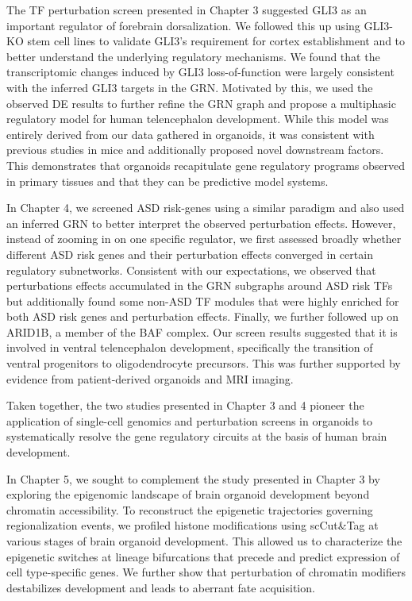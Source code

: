 The TF perturbation screen presented in Chapter 3 suggested GLI3 as an important regulator of forebrain dorsalization. We followed this up using GLI3-KO stem cell lines to validate GLI3's requirement for cortex establishment and to better understand the underlying regulatory mechanisms. We found that the transcriptomic changes induced by GLI3 loss-of-function were largely consistent with the inferred GLI3 targets in the GRN. Motivated by this, we used the observed DE results to further refine the GRN graph and propose a multiphasic regulatory model for human telencephalon development. While this model was entirely derived from our data gathered in organoids, it was consistent with previous studies in mice and additionally proposed novel downstream factors. This demonstrates that organoids recapitulate gene regulatory programs observed in primary tissues and that they can be predictive model systems.

In Chapter 4, we screened ASD risk-genes using a similar paradigm and also used an inferred GRN to better interpret the observed perturbation effects. However, instead of zooming in on one specific regulator, we first assessed broadly whether different ASD risk genes and their perturbation effects converged in certain regulatory subnetworks. Consistent with our expectations, we observed that perturbations effects accumulated in the GRN subgraphs around ASD risk TFs but additionally found some non-ASD TF modules that were highly enriched for both ASD risk genes and perturbation effects. Finally, we further followed up on ARID1B, a member of the BAF complex. Our screen results suggested that it is involved in ventral telencephalon development, specifically the transition of ventral progenitors to oligodendrocyte precursors. This was further supported by evidence from patient-derived organoids and MRI imaging. 

Taken together, the two studies presented in Chapter 3 and 4 pioneer the application of single-cell genomics and perturbation screens in organoids to systematically resolve the gene regulatory circuits at the basis of human brain development. 

In Chapter 5, we sought to complement the study presented in Chapter 3 by exploring the epigenomic landscape of brain organoid development beyond chromatin accessibility. To reconstruct the epigenetic trajectories governing regionalization events, we profiled histone modifications using scCut\&Tag at various stages of brain organoid development. This allowed us to characterize the epigenetic switches at lineage bifurcations that precede and predict expression of cell type-specific genes. We further show that  perturbation of chromatin modifiers destabilizes development and leads to aberrant fate acquisition. 



